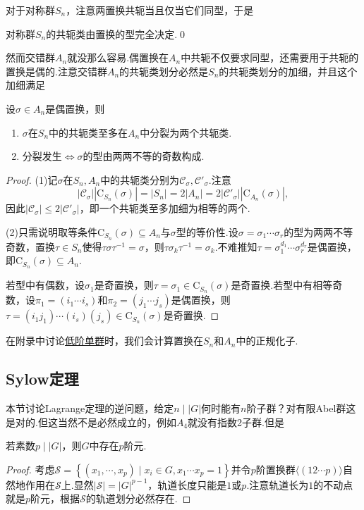 对于对称群$S_n$，注意两置换共轭当且仅当它们同型，于是
\begin{prop}
	对称群$S_n$的共轭类由置换的型完全决定.\qed
\end{prop}

然而交错群$A_n$就没那么容易.偶置换在$A_n$中共轭不仅要求同型，还需要用于共轭的置换是偶的.注意交错群$A_n$的共轭类划分必然是$S_n$的共轭类划分的加细，并且这个加细满足
\begin{prop}
	设$\sigma\in A_n$是偶置换，则\hypertarget{prop:ConjugationClassInAlternating}{}
	\begin{enumerate}
		\item $\sigma$在$S_n$中的共轭类至多在$A_n$中分裂为两个共轭类.
		\item 分裂发生$\iff$$\sigma$的型由两两不等的奇数构成.
	\end{enumerate}
\end{prop}
\begin{proof}
	\hspace*{5.4pt}(1)记$\sigma$在$S_n,A_n$中的共轭类分别为$\mathcal{C}_\sigma,\mathcal{C}'_\sigma$.注意
	\[
		|\mathcal{C}_\sigma||\mathrm{C}_{S_n}(\sigma)|=|S_n|=2|A_n|=2|\mathcal{C}'_\sigma||\mathrm{C}_{A_n}(\sigma)|,
	\]
	因此$|\mathcal{C}_\sigma|\le 2|\mathcal{C}'_{\sigma}|$，即一个共轭类至多加细为相等的两个.
	
	(2)只需说明取等条件$\mathrm{C}_{S_n}(\sigma)\subseteq A_n$与$\sigma$型的等价性.设$\sigma=\sigma_1\cdots\sigma_r$的型为两两不等奇数，置换$\tau\in S_n$使得$\tau\sigma\tau^{-1}=\sigma$，则$\tau\sigma_k\tau^{-1}=\sigma_k$.不难推知$\tau=\sigma_1^{d_1}\cdots\sigma_r^{d_r}$是偶置换，即$\mathrm{C}_{S_n}(\sigma)\subseteq A_n$.
	
	若型中有偶数，设$\sigma_1$是奇置换，则$\tau=\sigma_1\in\mathrm{C}_{S_n}(\sigma)$是奇置换.若型中有相等奇数，设$\pi_1=(i_1\cdots i_s)$和$\pi_2=(j_1\cdots j_s)$是偶置换，则$\tau=(i_1j_1)\cdots(i_s)(j_s)\in\mathrm{C}_{S_n}(\sigma)$是奇置换.
\end{proof}
\begin{remark}
	在附录中讨论\hyperlink{subsec:SimpleGrpLowOrder}{低阶单群}时，我们会计算置换在$S_n$和$A_n$中的正规化子.
\end{remark}
\subsection{Sylow定理}
本节讨论Lagrange定理的逆问题，给定$n\mid |G|$何时能有$n$阶子群？对有限Abel群这是对的.但这当然不是必然成立的，例如$A_4$就没有指数2子群.但是
\begin{thm}[(Cauchy)]
	若素数$p\mid|G|$，则$G$中存在$p$阶元.\hypertarget{thm:Cauchy}{}
\end{thm}
\begin{proof}
	考虑$\mathcal{S}=\left\{(x_1,\cdots,x_p)\mid x_i\in G,x_1\cdots x_p=1\right\}$并令$p$阶置换群$\langle (12\cdots p)\rangle $自然地作用在$\mathcal{S}$上.显然$|\mathcal{S}|=|G|^{p-1}$，轨道长度只能是$1$或$p$.注意轨道长为$1$的不动点就是$p$阶元，根据$\mathcal{S}$的轨道划分必然存在.
\end{proof}

